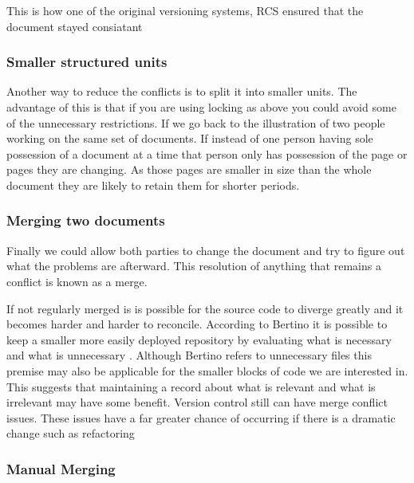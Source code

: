 This is how one of the original versioning systems, RCS ensured that the document stayed consiatant

\subsubsection{Smaller structured units}
Another way to reduce the conflicts is to split it into smaller units.  The advantage of this is that if you are using locking as above you could avoid some of the unnecessary restrictions. If we go back to the illustration of two people working on the same set of documents.  If instead of one person having sole possession of a document at a time that person only has possession of the page or pages they are changing. As those pages are smaller in size than the whole document they are likely to retain them for shorter periods.
\subsubsection{Merging two documents}
Finally we could allow both parties to change the document and try to figure out what the problems are afterward.  This resolution of anything that remains a conflict is known as a merge.

If not regularly merged is is possible for the source code to diverge greatly and it becomes harder and harder to reconcile.
 According to Bertino it is possible to keep a smaller more easily deployed repository by evaluating what is necessary and what is unnecessary \cite{Bertino2012}. Although Bertino refers to unnecessary files this premise may also be applicable for the smaller blocks of code we are interested in. This suggests that maintaining a record about what is relevant and what is irrelevant may have some benefit. Version control still can have merge conflict issues. These issues have a far greater chance of occurring if there is a dramatic change such as refactoring
 
\subsubsection{Manual Merging}


% 
% 

